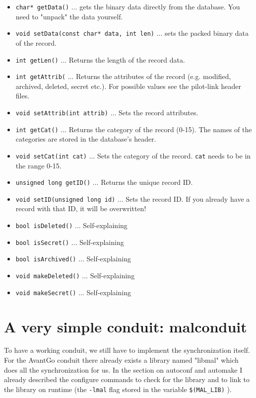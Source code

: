 \documentclass[10pt,a4paper]{article}
\newcommand{\code}[1]{{\small\texttt{#1}}}
\begin{document}
\begin{itemize}
\item\code{char* getData()} ... gets the binary data directly from the 
database. You need to "unpack" the data yourself.
\item\code{void setData(const char* data, int len)} ... sets the packed 
binary data of the record.
\item\code{int   getLen()} ... Returns the length of the record data.
\item\code{int   getAttrib(} ... Returns the attributes of the record 
(e.g. modified, archived, deleted, secret etc.). For possible values 
see the pilot-link header files.
\item\code{void  setAttrib(int attrib)} ... Sets the record attributes.

\item\code{int   getCat()} ... Returns the category of the record (0-15). 
The names of the categories are stored in the database's header.
\item\code{void  setCat(int cat)} ... Sets the category of the record. 
\code{cat} needs to be in the range 0-15.

\item\code{unsigned long getID()} ... Returns the unique record ID.
\item\code{void setID(unsigned long id)} ... Sets the record ID. If you 
already have a record with that ID, it will be overwritten!

\item\code{bool isDeleted()} ... Self-explaining
\item\code{bool isSecret()} ... Self-explaining
\item\code{bool isArchived()} ... Self-explaining
\item\code{void makeDeleted()} ... Self-explaining
\item\code{void makeSecret()} ... Self-explaining
\end{itemize}




\section{A very simple conduit: malconduit}\label{SectionSimpleConduit}

To have a working conduit, we still have to implement the synchronization 
itself. For the AvantGo conduit there already exists a library named 
"libmal" which does all the synchronization for us. In the section on 
autoconf and automake I already described the configure commands to check 
for the library and to link to the library on runtime (the \code{-lmal} 
flag stored in the variable \code{\$(MAL\_LIB)} ).
\end{document}
